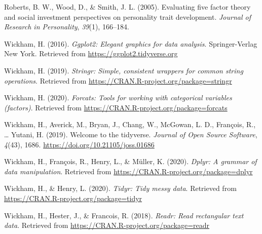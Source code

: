 \documentclass[
  english,
  man]{apa6}
\begin{document}
\leavevmode\hypertarget{ref-roberts2005}{}%
Roberts, B. W., Wood, D., \& Smith, J. L. (2005). Evaluating five factor theory and social investment perspectives on personality trait development. \emph{Journal of Research in Personality}, \emph{39}(1), 166--184.

\leavevmode\hypertarget{ref-R-ggplot2}{}%
Wickham, H. (2016). \emph{Ggplot2: Elegant graphics for data analysis}. Springer-Verlag New York. Retrieved from \url{https://ggplot2.tidyverse.org}

\leavevmode\hypertarget{ref-R-stringr}{}%
Wickham, H. (2019). \emph{Stringr: Simple, consistent wrappers for common string operations}. Retrieved from \url{https://CRAN.R-project.org/package=stringr}

\leavevmode\hypertarget{ref-R-forcats}{}%
Wickham, H. (2020). \emph{Forcats: Tools for working with categorical variables (factors)}. Retrieved from \url{https://CRAN.R-project.org/package=forcats}

\leavevmode\hypertarget{ref-R-tidyverse}{}%
Wickham, H., Averick, M., Bryan, J., Chang, W., McGowan, L. D., François, R., \ldots{} Yutani, H. (2019). Welcome to the tidyverse. \emph{Journal of Open Source Software}, \emph{4}(43), 1686. \url{https://doi.org/10.21105/joss.01686}

\leavevmode\hypertarget{ref-R-dplyr}{}%
Wickham, H., François, R., Henry, L., \& Müller, K. (2020). \emph{Dplyr: A grammar of data manipulation}. Retrieved from \url{https://CRAN.R-project.org/package=dplyr}

\leavevmode\hypertarget{ref-R-tidyr}{}%
Wickham, H., \& Henry, L. (2020). \emph{Tidyr: Tidy messy data}. Retrieved from \url{https://CRAN.R-project.org/package=tidyr}

\leavevmode\hypertarget{ref-R-readr}{}%
Wickham, H., Hester, J., \& Francois, R. (2018). \emph{Readr: Read rectangular text data}. Retrieved from \url{https://CRAN.R-project.org/package=readr}

\endgroup
\end{document}
